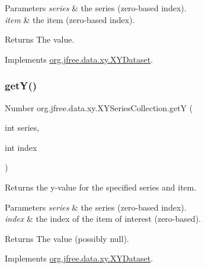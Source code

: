 \begin{DoxyParams}{Parameters}
{\em series} & the series (zero-\/based index). \\
\hline
{\em item} & the item (zero-\/based index).\\
\hline
\end{DoxyParams}
\begin{DoxyReturn}{Returns}
The value. 
\end{DoxyReturn}


Implements \mbox{\hyperlink{interfaceorg_1_1jfree_1_1data_1_1xy_1_1_x_y_dataset_a85c75ba5b69b551e96afd29d1732ba22}{org.\+jfree.\+data.\+xy.\+X\+Y\+Dataset}}.

\mbox{\label{classorg_1_1jfree_1_1data_1_1xy_1_1_x_y_series_collection_aaafd64893e0c908c3f7c3f9ffc8d9bc9}} 
\subsubsection{\texorpdfstring{get\+Y()}{getY()}}
{\footnotesize\ttfamily Number org.\+jfree.\+data.\+xy.\+X\+Y\+Series\+Collection.\+getY (\begin{DoxyParamCaption}\item[{int}]{series,  }\item[{int}]{index }\end{DoxyParamCaption})}

Returns the y-\/value for the specified series and item.


\begin{DoxyParams}{Parameters}
{\em series} & the series (zero-\/based index). \\
\hline
{\em index} & the index of the item of interest (zero-\/based).\\
\hline
\end{DoxyParams}
\begin{DoxyReturn}{Returns}
The value (possibly {\ttfamily null}). 
\end{DoxyReturn}


Implements \mbox{\hyperlink{interfaceorg_1_1jfree_1_1data_1_1xy_1_1_x_y_dataset_aa915867221e0f94021bad3140db5254e}{org.\+jfree.\+data.\+xy.\+X\+Y\+Dataset}}.

